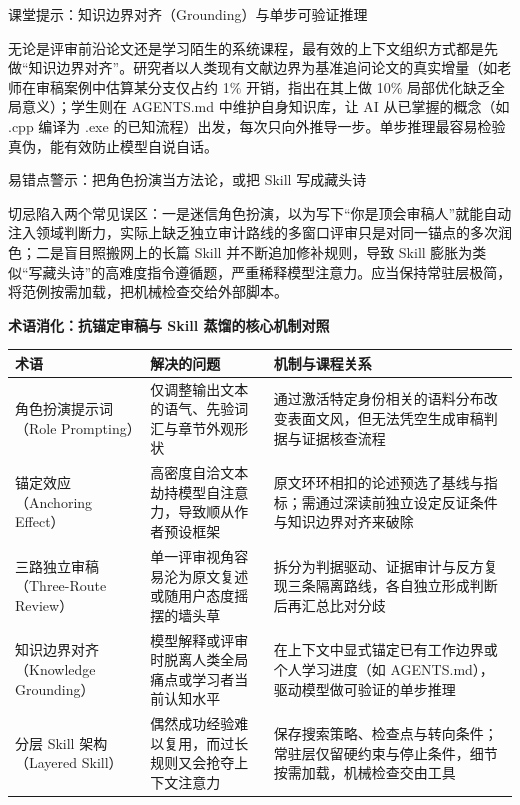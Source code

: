 \documentclass[UTF8,a4paper,11pt,fontset=fandol]{ctexart}
\begin{document}
\begin{knowledgebox}{课堂提示：知识边界对齐（Grounding）与单步可验证推理}

无论是评审前沿论文还是学习陌生的系统课程，最有效的上下文组织方式都是先做“知识边界对齐”。研究者以人类现有文献边界为基准追问论文的真实增量（如老师在审稿案例中估算某分支仅占约 1\% 开销，指出在其上做 10\% 局部优化缺乏全局意义）；学生则在 AGENTS.md 中维护自身知识库，让 AI 从已掌握的概念（如 .cpp 编译为 .exe 的已知流程）出发，每次只向外推导一步。单步推理最容易检验真伪，能有效防止模型自说自话。

\end{knowledgebox}

\begin{warningbox}{易错点警示：把角色扮演当方法论，或把 Skill 写成藏头诗}

切忌陷入两个常见误区：一是迷信角色扮演，以为写下“你是顶会审稿人”就能自动注入领域判断力，实际上缺乏独立审计路线的多窗口评审只是对同一锚点的多次润色；二是盲目照搬网上的长篇 Skill 并不断追加修补规则，导致 Skill 膨胀为类似“写藏头诗”的高难度指令遵循题，严重稀释模型注意力。应当保持常驻层极简，将范例按需加载，把机械检查交给外部脚本。

\end{warningbox}

\par{}\textbf{术语消化：抗锚定审稿与 Skill 蒸馏的核心机制对照}

\begin{center}\small\begin{tabularx}{\linewidth}{YYY}

\toprule

术语 & 解决的问题 & 机制与课程关系\\\midrule

角色扮演提示词（Role Prompting） & 仅调整输出文本的语气、先验词汇与章节外观形状 & 通过激活特定身份相关的语料分布改变表面文风，但无法凭空生成审稿判据与证据核查流程\\[3pt]

锚定效应（Anchoring Effect） & 高密度自洽文本劫持模型自注意力，导致顺从作者预设框架 & 原文环环相扣的论述预选了基线与指标；需通过深读前独立设定反证条件与知识边界对齐来破除\\[3pt]

三路独立审稿（Three-Route Review） & 单一评审视角容易沦为原文复述或随用户态度摇摆的墙头草 & 拆分为判据驱动、证据审计与反方复现三条隔离路线，各自独立形成判断后再汇总比对分歧\\[3pt]

知识边界对齐（Knowledge Grounding） & 模型解释或评审时脱离人类全局痛点或学习者当前认知水平 & 在上下文中显式锚定已有工作边界或个人学习进度（如 AGENTS.md），驱动模型做可验证的单步推理\\[3pt]

分层 Skill 架构（Layered Skill） & 偶然成功经验难以复用，而过长规则又会抢夺上下文注意力 & 保存搜索策略、检查点与转向条件；常驻层仅留硬约束与停止条件，细节按需加载，机械检查交由工具\\[3pt]

\bottomrule\end{tabularx}\end{center}
\end{document}

